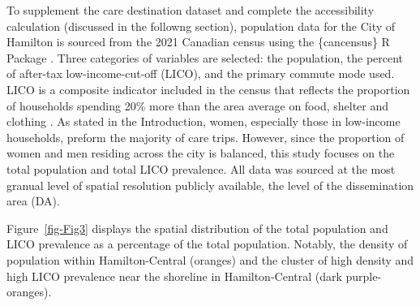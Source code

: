 \documentclass[
  authoryear,
  preprint,
  3p]{elsarticle}
\begin{document}
To supplement the care destination dataset and complete the
accessibility calculation (discussed in the followng section),
population data for the City of Hamilton is sourced from the 2021
Canadian census using the \{cancensus\} R Package
\citep{governmentofcanadaCensusPopulation2023, vonbergmannCancensusCensusMapper2021}.
Three categories of variables are selected: the population, the percent
of after-tax low-income-cut-off (LICO), and the primary commute mode
used. LICO is a composite indicator included in the census that reflects
the proportion of households spending 20\% more than the area average on
food, shelter and clothing
\citep{governmentofcanadaLowIncomeCutoffs2023}. As stated in the
Introduction, women, especially those in low-income households, preform
the majority of care trips. However, since the proportion of women and
men residing across the city is balanced, this study focuses on the
total population and total LICO prevalence. All data was sourced at the
most granual level of spatial resolution publicly available, the level
of the dissemination area (DA).

Figure~\ref{fig-Fig3} displays the spatial distribution of the total
population and LICO prevalence as a percentage of the total population.
Notably, the density of population within Hamilton-Central (oranges) and
the cluster of high density and high LICO prevalence near the shoreline
in Hamilton-Central (dark purple-oranges).
\end{document}
